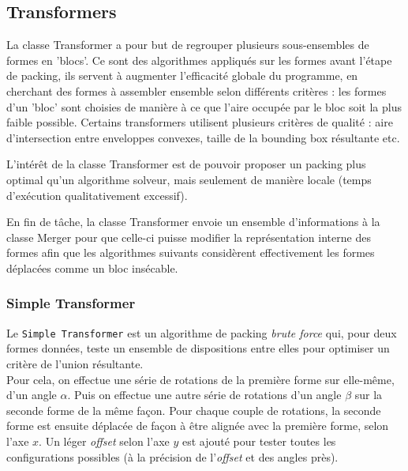 %    



\subsection{Transformers}
La classe Transformer a pour but de regrouper plusieurs sous-ensembles de formes en 'blocs'. Ce sont des algorithmes appliqués sur les formes avant l'étape de packing, ils servent à augmenter l'efficacité globale du programme, en cherchant des formes à assembler ensemble selon différents critères : les formes d'un 'bloc' sont choisies de manière à ce que l'aire occupée par le bloc soit la plus faible possible.
Certains transformers utilisent plusieurs critères de qualité : aire d'intersection entre enveloppes convexes, taille de la bounding box résultante etc.

L'intérêt de la classe Transformer est de pouvoir proposer un packing plus optimal qu'un algorithme solveur, mais seulement de manière locale (temps d'exécution qualitativement excessif).

En fin de tâche, la classe Transformer envoie un ensemble d'informations à la classe Merger pour que celle-ci puisse modifier la représentation interne des formes afin que les algorithmes suivants considèrent effectivement les formes déplacées comme un bloc insécable.


\subsubsection{Simple Transformer}

\indent Le \texttt{Simple Transformer} est un algorithme de packing \textit{brute force} qui, pour deux formes données, teste un ensemble de dispositions entre elles pour optimiser un critère de l'union résultante.\\

Pour cela, on effectue une série de rotations de la première forme sur elle-même, d'un angle $\alpha$. Puis on effectue une autre série de rotations d'un angle $\beta$ sur la seconde forme de la même façon. Pour chaque couple de rotations, la seconde forme est ensuite déplacée de façon à être alignée avec la première forme, selon l'axe $x$. Un léger \textit{offset} selon l'axe $y$ est ajouté pour tester toutes les configurations possibles (à la précision de l'\textit{offset} et des angles près). 

